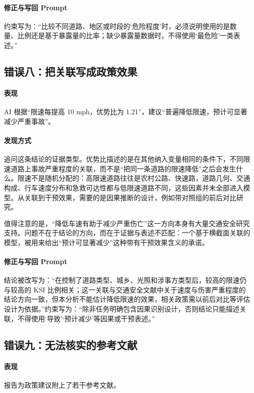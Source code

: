 \paragraph{修正与写回 Prompt} 约束写为：“比较不同道路、地区或时段的‘危险程度’时，必须说明使用的是数量、比例还是基于暴露量的比率；缺少暴露量数据时，不得使用‘最危险’一类表述。”

\subsection{错误八：把关联写成政策效果}

\paragraph{表现} AI 根据“限速每提高 10 mph，优势比为 1.21”，建议“普遍降低限速，预计可显著减少严重事故”。

\paragraph{发现方式} 追问这条结论的证据类型。优势比描述的是在其他纳入变量相同的条件下，不同限速道路上事故严重程度的关联，而不是“把同一条道路的限速降低”之后会发生什么。限速不是随机分配的：高限速道路往往是农村公路、快速路，道路几何、交通构成、行车速度分布和急救可达性都与低限速道路不同，这些因素并未全部进入模型。从关联到干预效果，需要的是因果推断的设计，例如带对照组的前后对比研究\cite{hernan2020causal}。

值得注意的是，“降低车速有助于减少严重伤亡”这一方向本身有大量交通安全研究支持。问题不在于结论的方向，而在于证据与表述不匹配：一个基于横截面关联的模型，被用来给出“预计可显著减少”这种带有干预效果含义的承诺。

\paragraph{修正与写回 Prompt} 结论被改写为：“在控制了道路类型、城乡、光照和涉事方类型后，较高的限速仍与较高的 KSI 比例相关；这一关联与交通安全文献中关于速度与伤害严重程度的结论方向一致，但本分析不能估计降低限速的效果，相关政策需以前后对比等评估设计为依据。”约束写为：“除非任务明确包含因果识别设计，否则结论只能描述关联，不得使用‘导致’‘预计减少’等因果或干预表述。”

\subsection{错误九：无法核实的参考文献}

\paragraph{表现} 报告为政策建议附上了若干参考文献。


